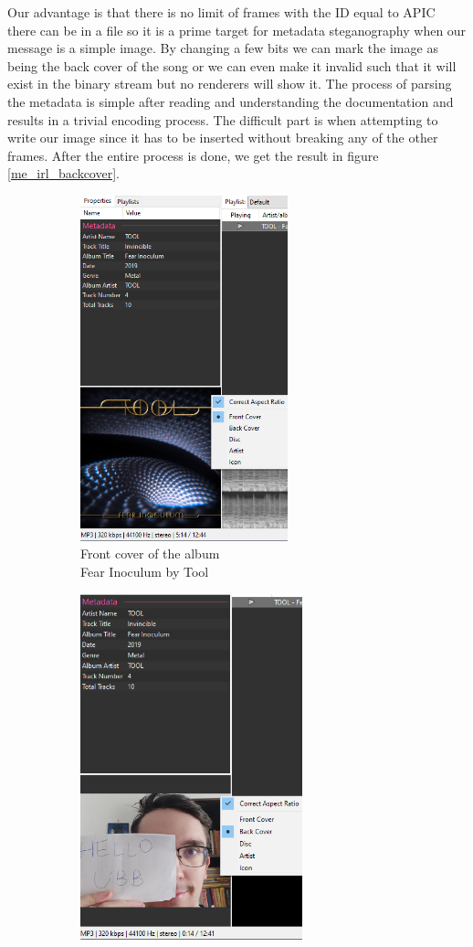 Our advantage is that there is no limit of frames with the ID equal to APIC there can be in a file so it is a prime target for metadata steganography when our message is a simple image. By changing a few bits we can mark the image as being the back cover of the song or we can even make it invalid such that it will exist in the binary stream but no renderers will show it. The process of parsing the metadata is simple after reading and understanding the documentation and results in a trivial encoding process. The difficult part is when attempting to write our image since it has to be inserted without breaking any of the other frames. After the entire process is done, we get the result in figure \ref{me_irl_backcover}.

\begin{figure}[H]
\centering
\begin{subfigure}{.5\textwidth}
    \centering
    \includegraphics[height=10cm,keepaspectratio]{pics/audio_chapter/tool_cover_example.png}
    \caption{Front cover of the album\\ Fear Inoculum by Tool}
    \label{tool_normal_cover_pic}
\end{subfigure}%
\begin{subfigure}{.5\textwidth}
    \centering
    \includegraphics[height=10cm,keepaspectratio]{pics/audio_chapter/tool_backcover_example.png}

\end{subfigure}
\end{figure}
